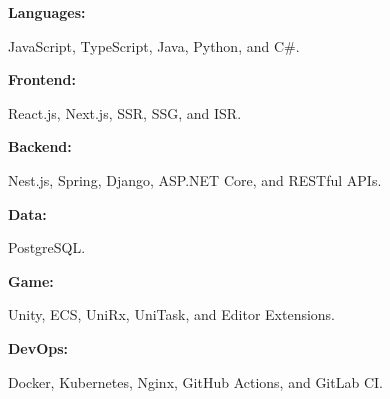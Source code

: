 \begin{minipage}[t]{0.47\textwidth}
    \vspace{-6pt}

    \begin{minipage}[t]{0.14\textwidth}
        \textbf{Languages:}
    \end{minipage}
    \hfill
    \begin{minipage}[t]{0.79\textwidth}
        JavaScript, TypeScript, Java, Python, and C\#.
    \end{minipage}
    \vspace{4pt}

    \begin{minipage}[t]{0.14\textwidth}
        \textbf{Frontend:}
    \end{minipage}
    \hfill
    \begin{minipage}[t]{0.79\textwidth}
        React.js, Next.js, SSR, SSG, and ISR.
    \end{minipage}
    \vspace{4pt}

    \begin{minipage}[t]{0.14\textwidth}
        \textbf{Backend:}
    \end{minipage}
    \hfill
    \begin{minipage}[t]{0.79\textwidth}
        Nest.js, Spring, Django, ASP.NET Core, and RESTful APIs.
    \end{minipage}
    \vspace{4pt}

    \begin{minipage}[t]{0.14\textwidth}
        \textbf{Data:}
    \end{minipage}
    \hfill
    \begin{minipage}[t]{0.79\textwidth}
        PostgreSQL.
    \end{minipage}
    \vspace{4pt}

    \begin{minipage}[t]{0.14\textwidth}
        \textbf{Game:}
    \end{minipage}
    \hfill
    \begin{minipage}[t]{0.79\textwidth}
        Unity, ECS, UniRx, UniTask, and Editor Extensions.
    \end{minipage}
    \vspace{4pt}

    \begin{minipage}[t]{0.14\textwidth}
        \textbf{DevOps:}
    \end{minipage}
    \hfill
    \begin{minipage}[t]{0.79\textwidth}
        Docker, Kubernetes, Nginx, GitHub Actions, and GitLab CI.
    \end{minipage}
    \vspace{4pt}


\end{minipage}

